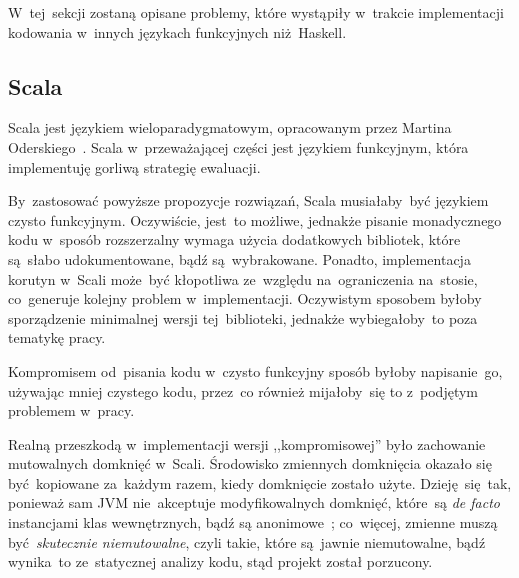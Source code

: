 \documentclass[../../thesis.tex]{subfiles}
\begin{document}
W~tej~sekcji zostaną opisane problemy, które wystąpiły w~trakcie implementacji
kodowania w~innych językach funkcyjnych niż~Haskell. 

\subsection{Scala}

Scala jest językiem wieloparadygmatowym, opracowanym przez Martina Oderskiego~\cite{Odersky:BHS}.
Scala w~przeważającej części jest językiem funkcyjnym, która implementuję gorliwą strategię
ewaluacji.

By~zastosować powyższe propozycje rozwiązań, Scala musiałaby~być językiem czysto funkcyjnym.
Oczywiście, jest~to możliwe, jednakże pisanie monadycznego kodu w~sposób rozszerzalny
wymaga użycia dodatkowych bibliotek, które są~słabo udokumentowane, bądź są~wybrakowane.
Ponadto, implementacja korutyn w~Scali może~być kłopotliwa ze~względu na~ograniczenia
na~stosie, co~generuje kolejny problem w~implementacji. Oczywistym sposobem byłoby
sporządzenie minimalnej wersji tej~biblioteki, jednakże wybiegałoby~to poza tematykę pracy.

Kompromisem od~pisania kodu w~czysto funkcyjny sposób byłoby napisanie~go, używając
mniej czystego kodu, przez~co również mijałoby~się to z~podjętym problemem w~pracy.

Realną przeszkodą w~implementacji wersji ,,kompromisowej'' było zachowanie mutowalnych
domknięć w~Scali. Środowisko zmiennych domknięcia okazało się być~kopiowane za~każdym razem, kiedy
domknięcie zostało użyte. Dzieję~się~tak, ponieważ sam JVM nie~akceptuje modyfikowalnych
domknięć, które~są \emph{de facto} instancjami klas wewnętrznych, bądź są anonimowe~\cite{Oracle:IC}; co~więcej, 
zmienne muszą być~\emph{skutecznie niemutowalne}, czyli takie, które są~jawnie 
niemutowalne, bądź wynika~to ze~statycznej analizy kodu, stąd projekt został porzucony.
\end{document}
